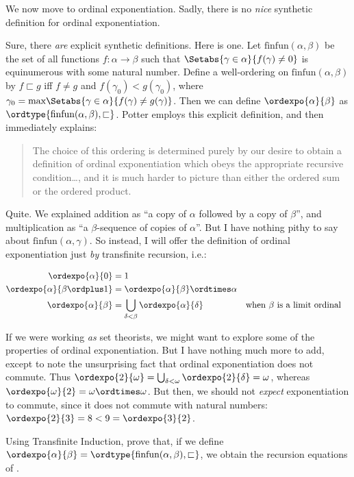 \documentclass[../../../include/open-logic-section]{subfiles}
\begin{document}
We now move to ordinal exponentiation. Sadly, there is no \emph{nice} synthetic definition for ordinal exponentiation.

Sure, there \emph{are} explicit synthetic definitions. Here is one. Let $\text{finfun}(\alpha,\beta)$ be the set of all functions $f \colon \alpha \to \beta$ such that $\Setabs{\gamma \in \alpha}{f(\gamma) \neq 0}$ is equinumerous with some natural number. Define a well-ordering on $\text{finfun}(\alpha,\beta)$ by $f \sqsubset g$ iff $f \neq g$ and $f(\gamma_0) < g(\gamma_0)$, where $\gamma_0 = \text{max}\Setabs{\gamma \in \alpha}{f(\gamma) \neq g(\gamma)}$. Then we can define $\ordexpo{\alpha}{\beta}$ as $\ordtype{\text{finfun}(\alpha, \beta), \sqsubset}$. Potter employs this explicit definition, and then immediately explains:
\begin{quote}
	The choice of this ordering is determined purely by our desire to obtain a definition of ordinal exponentiation which obeys the appropriate recursive condition\ldots, and it is much harder to picture than either the ordered sum or the ordered product. \citep[199]{Potter2004}
\end{quote}
Quite. We explained addition as ``a copy of $\alpha$ followed by a copy of $\beta$'', and multiplication as ``a $\beta$-sequence of copies of $\alpha$''. But I have nothing pithy to say about $\text{finfun}(\alpha, \gamma)$. So instead, I will offer the definition of ordinal exponentiation just \emph{by} transfinite recursion, i.e.:
\begin{defn}
	\begin{align*}
		\ordexpo{\alpha}{0} &= 1\\
		\ordexpo{\alpha}{\beta\ordplus 1} &=\ordexpo{\alpha}{\beta} \ordtimes \alpha\\
		\ordexpo{\alpha}{\beta} &= \bigcup_{\delta < \beta}\ordexpo{\alpha}{\delta}& & \text{when $\beta$ is a limit ordinal}
	\end{align*}
\end{defn}\noindent
If we were working \emph{as} set theorists, we might want to explore some of the properties of ordinal exponentiation. But I have nothing much more to add, except to note the unsurprising fact that ordinal exponentiation does not commute. Thus $\ordexpo{2}{\omega} = \bigcup_{\delta < \omega}\ordexpo{2}{\delta} = \omega$, whereas $\ordexpo{\omega}{2} = \omega \ordtimes \omega$. But then, we should not \emph{expect} exponentiation to commute, since it does not commute with natural numbers: $\ordexpo{2}{3} = 8 < 9 = \ordexpo{3}{2}$. 
\begin{prob}
	Using Transfinite Induction, prove that, if we define $\ordexpo{\alpha}{\beta} = \ordtype{\text{finfun}(\alpha, \beta), \sqsubset}$, we obtain the recursion equations of .
\end{prob}
\end{document}
